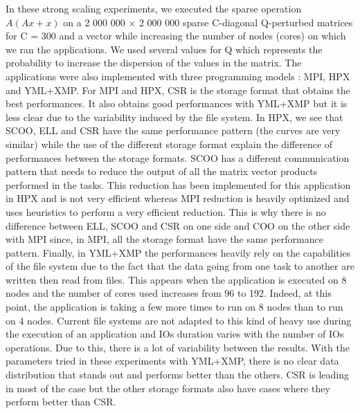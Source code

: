 In these strong scaling experiments, we executed the sparse operation $A(Ax+x)$ on a 2 000 000 $\times$ 2 000 000 sparse C-diagonal Q-perturbed matrices for C = 300 and a vector while increasing the number of nodes (cores) on which we ran the applications.
We used several values for Q which represents the probability to increase the dispersion of the values in the matrix.
The applications were also implemented with three programming models : MPI, HPX and YML+XMP.
For MPI and HPX, CSR is the storage format that obtains the best performances.
It also obtains good performances with YML+XMP but it is less clear due to the variability induced by the file system.
In HPX, we see that SCOO, ELL and CSR have the same performance pattern (the curves are very similar) while the use of the different storage format explain the difference of performances between the storage formats.
SCOO has a different communication pattern that needs to reduce the output of all the matrix vector products performed in the tasks.
This reduction has been implemented for this application in HPX and is not very efficient whereas MPI reduction is heavily optimized and uses heuristics to perform a very efficient reduction.
This is why there is no difference between ELL, SCOO and CSR on one side and COO on the other side with MPI since, in MPI, all the storage format have the same performance pattern.
Finally, in YML+XMP the performances heavily rely on the capabilities of the file system due to the fact that the data going from one task to another are written then read from files.
This appears when the application is executed on 8 nodes and the number of cores used increases from 96 to 192.
Indeed, at this point, the application is taking a few more times to run on 8 nodes than to run on 4 nodes.
Current file systems are not adapted to this kind of heavy use during the execution of an application and IOs duration varies with the number of IOs operations.
Due to this, there is a lot of variability between the results.
With the parameters tried in these experiments with YML+XMP, there is no clear data distribution that stands out and performs better than the others.
CSR is leading in most of the case but the other storage formats also have cases where they perform better than CSR.

